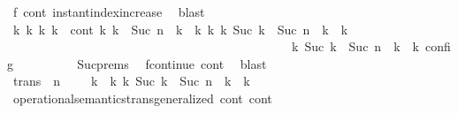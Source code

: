 \begin{isabellebody}
\ f{}\ cont\ instant{\isacharunderscore}index{\isacharunderscore}increase\ \isamarkupfalse%
\ blast\isanewline
\ \ \ \ \ \ \isamarkupfalse%
\ {\isasymGamma}\isactrlsub k{\isacharprime}\ {\isasymPsi}\isactrlsub k{\isacharprime}\ {\isasymPhi}\isactrlsub k{\isacharprime}\ k{\isacharprime}\ \ cont{}{\isacharcolon}\ {\isacartoucheopen}{\isacharparenleft}{\isacharparenleft}{\isasymGamma}\isactrlsub k{\isacharcomma}\ {\isasymdelta}k\ {\isacharplus}\ Suc\ n\ {\isasymturnstile}\ {\isasymPsi}\isactrlsub k\ {\isasymtriangleright}\ {\isasymPhi}\isactrlsub k{\isacharparenright}\ {\isasymhookrightarrow}\isactrlbsup k{\isacharprime}\isactrlesup \ {\isacharparenleft}{\isasymGamma}\isactrlsub k{\isacharprime}{\isacharcomma}\ Suc\ {\isacharparenleft}{\isasymdelta}k\ {\isacharplus}\ Suc\ n{\isacharparenright}\ {\isasymturnstile}\ {\isasymPsi}\isactrlsub k{\isacharprime}\ {\isasymtriangleright}\ {\isasymPhi}\isactrlsub k{\isacharprime}{\isacharparenright}{\isacharparenright}\isanewline
\ \ \ \ \ \ \ \ \ \ \ \ \ \ \ \ \ \ \ \ \ \ \ \ \ \ \ \ \ \ \ \ \ \ \ \ \ \ \ \ \ \ {\isasymand}\ {\isasymrho}\ {\isasymin}\ {\isasymlbrakk}\ {\isasymGamma}\isactrlsub k{\isacharprime}{\isacharcomma}\ Suc\ {\isacharparenleft}{\isasymdelta}k\ {\isacharplus}\ Suc\ n{\isacharparenright}\ {\isasymturnstile}\ {\isasymPsi}\isactrlsub k{\isacharprime}\ {\isasymtriangleright}\ {\isasymPhi}\isactrlsub k{\isacharprime}\ {\isasymrbrakk}\isactrlsub c\isactrlsub o\isactrlsub n\isactrlsub f\isactrlsub i\isactrlsub g{\isacartoucheclose}\isanewline
\ \ \ \ \ \ \ \ \isamarkupfalse%
\ Suc{\isachardot}prems\ \isamarkupfalse%
\ fcontinue\ cont\ \isamarkupfalse%
\ blast\isanewline
\ \ \ \ \ \ \isamarkupfalse%
\ trans{\isacharcolon}\ {\isacartoucheopen}{\isacharparenleft}{\isasymGamma}{\isacharcomma}\ n\ {\isasymturnstile}\ {\isasymPsi}\ {\isasymtriangleright}\ {\isasymPhi}{\isacharparenright}\ {\isasymhookrightarrow}\isactrlbsup k\ {\isacharplus}\ k{\isacharprime}\isactrlesup \ {\isacharparenleft}{\isasymGamma}\isactrlsub k{\isacharprime}{\isacharcomma}\ Suc\ {\isacharparenleft}{\isasymdelta}k\ {\isacharplus}\ Suc\ n{\isacharparenright}\ {\isasymturnstile}\ {\isasymPsi}\isactrlsub k{\isacharprime}\ {\isasymtriangleright}\ {\isasymPhi}\isactrlsub k{\isacharprime}{\isacharparenright}{\isacartoucheclose}\isanewline
\ \ \ \ \ \ \ \ \isamarkupfalse%
\ operational{\isacharunderscore}semantics{\isacharunderscore}trans{\isacharunderscore}generalized\ cont\ cont{}\isanewline

\end{isabellebody}
